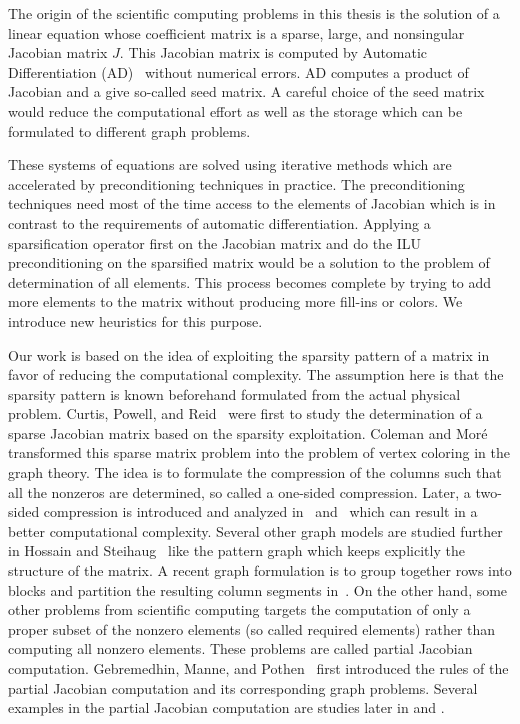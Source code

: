 \documentclass[12pt, twoside,a4paper,toc=bibliography]{scrbook}
\begin{document}
The origin of the scientific computing problems in this thesis is the solution of a linear equation whose coefficient matrix is a sparse, large, and nonsingular Jacobian matrix $J$. 
This Jacobian matrix is computed by Automatic Differentiation (AD)~\cite{Griewank2008EDP,Rall1981ADT} without numerical errors.
AD computes a product of Jacobian and a give so-called seed matrix.
A careful choice of the seed matrix would reduce the computational effort as well as 
the storage which can be formulated to different graph problems.

These systems of equations are solved using iterative methods which are accelerated by preconditioning techniques in practice.
The preconditioning techniques need most of the time access to
the elements of Jacobian which is in contrast to the requirements of automatic differentiation.
Applying a sparsification operator first on the Jacobian matrix and do the ILU preconditioning
on the sparsified matrix would be a solution to the problem of determination of
all elements. This process becomes complete by trying to add more elements to the matrix
without producing more fill-ins or colors. We introduce new heuristics for this purpose.

Our work is based on the idea of exploiting the sparsity pattern of a matrix in favor of 
reducing the computational complexity. The assumption here is that the sparsity pattern is
known beforehand formulated from the actual physical problem.
Curtis, Powell, and Reid~\cite{Curtis1974117} were first to study the determination of 
a sparse Jacobian matrix based on the sparsity exploitation.
Coleman and Mor{\'e}~\cite{Coleman1983EoS} transformed this sparse matrix problem
into the problem of vertex coloring in the graph theory. The idea is to formulate
the compression of the columns such that all the nonzeros are determined, so called
a one-sided compression.
Later, a two-sided compression is introduced and analyzed in~\cite{Coleman1996SaE}
and~\cite{hs:csj} which can result in a better computational complexity.
Several other graph models are studied further in Hossain and Steihaug~\cite{hs:gmei} 
like the pattern graph which keeps explicitly the structure of the matrix.
A recent graph formulation is to group together rows into blocks 
and partition the resulting column segments in~\cite{optimal_diret_determination}.
On the other hand, some other problems from scientific computing targets the computation
of only a proper subset of the nonzero elements (so called required elements)
rather than computing all nonzero elements.
These problems are called partial Jacobian computation.
Gebremedhin, Manne, and Pothen~\cite{Gebremedhin05whatcolor} first introduced
the rules of the partial Jacobian computation and its corresponding graph problems. 
Several examples in the partial Jacobian computation are studies later in
\cite{CalotoiuMaster} and \cite{LulfesmannMaster}. 
\end{document}

